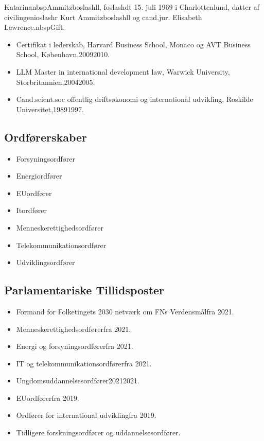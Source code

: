\documentclass[11pt, a4paper]{awesome-cv}
\begin{document}
\makecvheader[R]
\makelettertitle
\begin{cvletter}
KatarinanbspAmmitzboslashll, foslashdt 15. juli 1969 i Charlottenlund, datter af civilingenioslashr Kurt Ammitzboslashll og cand.jur. Elisabeth Lawrence.nbspGift.

\begin{itemize}
\item Certifikat i lederskab, Harvard Business School, Monaco og AVT Business School, København,20092010.
\item LLM Master in  international development law, Warwick University, Storbritannien,20042005.
\item Cand.scient.soc offentlig driftsøkonomi og international udvikling, Roskilde Universitet,19891997.
\end{itemize}
\subsection*{Ordførerskaber}
\begin{itemize}
\item Forsyningsordfører
\item Energiordfører
\item EUordfører
\item Itordfører
\item Menneskerettighedsordfører
\item Telekommunikationsordfører
\item Udviklingsordfører
\end{itemize}
\subsection*{Parlamentariske Tillidsposter}
\begin{itemize}
\item Formand for Folketingets 2030 netværk om FNs Verdensmålfra 2021.
\item Menneskerettighedsordførerfra 2021.
\item Energi og forsyningsordførerfra 2021.
\item IT og telekommunikationsordførerfra 2021.
\item Ungdomsuddannelsesordfører20212021.
\item EUordførerfra 2019.
\item Ordfører for international udviklingfra 2019.
\item Tidligere forskningsordfører og uddannelsesordfører.
\end{itemize}

\end{cvletter}
\end{document}
